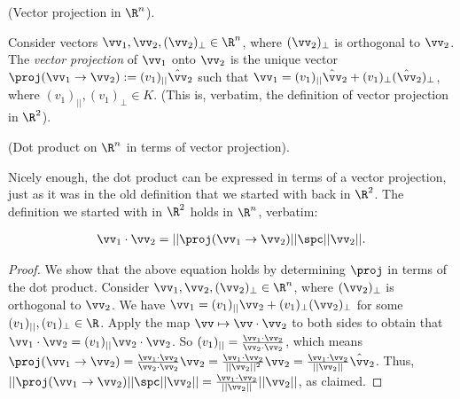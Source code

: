 \begin{defn}
    (Vector projection in $\R^n$).
    
    Consider vectors $\vv_1, \vv_2, (\vv_2)_\perp \in \R^n$, where $(\vv_2)_\perp$ is orthogonal to $\vv_2$. The \textit{vector projection} of $\vv_1$ onto $\vv_2$ is the unique vector $\proj(\vv_1 \rightarrow \vv_2) := (v_1)_{||} \hat{\vv}_2$ such that $\vv_1 = (v_1)_{||} \hat{\vv}_2 + (v_1)_\perp (\hat{\vv}_2)_\perp$, where $(v_1)_{||}, (v_1)_\perp \in K$. (This is, verbatim, the definition of vector projection in $\R^2$).
\end{defn}

\begin{theorem}
    (Dot product on $\R^n$ in terms of vector projection).
    
    Nicely enough, the dot product can be expressed in terms of a vector projection, just as it was in the old definition that we started with back in $\R^2$. The definition we started with in $\R^2$ holds in $\R^n$, verbatim:
    
    \begin{align*}
        \vv_1 \cdot \vv_2 =  || \proj(\vv_1 \rightarrow \vv_2) || \spc ||\vv_2||.
    \end{align*}
\end{theorem}

\begin{proof}
   We show that the above equation holds by determining $\proj$ in terms of the dot product. Consider $\vv_1, \vv_2, (\vv_2)_\perp \in \R^n$, where $(\vv_2)_\perp$ is orthogonal to $\vv_2$. We have $\vv_1 = (v_1)_{||} \vv_2 + (v_1)_\perp (\vv_2)_\perp$ for some $(v_1)_{||}, (v_1)_\perp \in \R$. Apply the map $\vv \mapsto \vv \cdot \vv_2$ to both sides to obtain that $\vv_1 \cdot \vv_2 = (v_1)_{||} \vv_2 \cdot \vv_2$. So $(v_1)_{||} = \frac{\vv_1 \cdot \vv_2}{\vv_2 \cdot \vv_2}$, which means $\proj(\vv_1 \rightarrow \vv_2) = \frac{\vv_1 \cdot \vv_2}{\vv_2 \cdot \vv_2} \vv_2 = \frac{\vv_1 \cdot \vv_2}{||\vv_2||^2}\vv_2 = \frac{\vv_1 \cdot \vv_2}{||\vv_2||}\hat{\vv}_2$. Thus, ${||\proj(\vv_1 \rightarrow \vv_2)|| \spc ||\vv_2|| = \frac{\vv_1 \cdot \vv_2}{||\vv_2||} ||\vv_2||}$, as claimed.
\end{proof}

